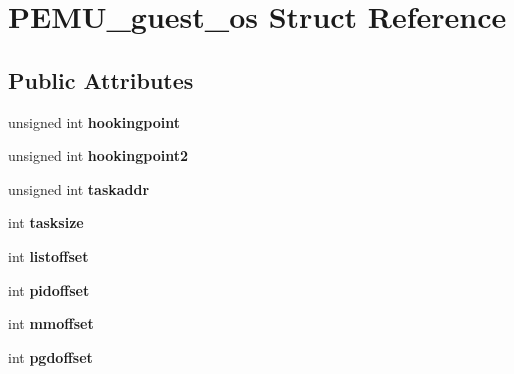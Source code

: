 \hypertarget{structPEMU__guest__os}{\section{\-P\-E\-M\-U\-\_\-guest\-\_\-os \-Struct \-Reference}
\label{structPEMU__guest__os}
}
\subsection*{\-Public \-Attributes}
\begin{DoxyCompactItemize}
\item 
\hypertarget{structPEMU__guest__os_ad7626a3026e27e2efa4ce09a248b4f1d}{unsigned int {\bfseries hookingpoint}}\label{structPEMU__guest__os_ad7626a3026e27e2efa4ce09a248b4f1d}

\item 
\hypertarget{structPEMU__guest__os_ad608fe65e014395a69fbfc83feb6486b}{unsigned int {\bfseries hookingpoint2}}\label{structPEMU__guest__os_ad608fe65e014395a69fbfc83feb6486b}

\item 
\hypertarget{structPEMU__guest__os_a121bd1de268fa5a25cbed995abebf8f0}{unsigned int {\bfseries taskaddr}}\label{structPEMU__guest__os_a121bd1de268fa5a25cbed995abebf8f0}

\item 
\hypertarget{structPEMU__guest__os_aded04fae646be11bc552280f3ce67e2d}{int {\bfseries tasksize}}\label{structPEMU__guest__os_aded04fae646be11bc552280f3ce67e2d}

\item 
\hypertarget{structPEMU__guest__os_ab7b7edfd8590017abab7ed5ed1959015}{int {\bfseries listoffset}}\label{structPEMU__guest__os_ab7b7edfd8590017abab7ed5ed1959015}

\item 
\hypertarget{structPEMU__guest__os_a5761cc0ab17952af35e41899800cf064}{int {\bfseries pidoffset}}\label{structPEMU__guest__os_a5761cc0ab17952af35e41899800cf064}

\item 
\hypertarget{structPEMU__guest__os_ae8c2583ee11264eea1642819fb9a6cc4}{int {\bfseries mmoffset}}\label{structPEMU__guest__os_ae8c2583ee11264eea1642819fb9a6cc4}

\item 
\hypertarget{structPEMU__guest__os_ace5bf0655a333f037c160d9decda566f}{int {\bfseries pgdoffset}}\label{structPEMU__guest__os_ace5bf0655a333f037c160d9decda566f}


\end{DoxyCompactItemize}
